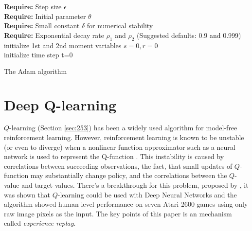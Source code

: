             \begin{algorithm}[H]\label{alg:5}
            \textbf{Require:} Step size $\epsilon$ \\
            \textbf{Require:} Initial parameter $\theta$ \\
            \textbf{Require:} Small constant $\delta $ for numerical stability \\
            \textbf{Require:} Exponential decay rate $\rho_1$ and $\rho_2$ (Suggested defaults: 0.9 and 0.999)
                initialize 1st and 2nd moment variables $s=0, r=0$ \\
                initialize time step t=0\\
            
            \caption{The Adam algorithm}
            \end{algorithm}

\section{Deep Q-learning}
    \label{sec:dql}
    $Q$-learning (Section \ref{sec:253}) has been a widely used algorithm for model-free reinforcement learning. However, reinforcement learning is known to be unstable (or even to diverge) when a nonlinear function approximator such as a neural network is used to represent the Q-function \cite{Tsitsiklis97ananalysis}. This instability is caused by correlations between succeeding observations, the fact, that small updates of $Q$-function
    may substantially change policy, and the correlations between the $Q$-value and target values. There's a breakthrough for this problem, proposed by \cite{mnih2015humanlevel}, it was shown that $Q$-learning could be used with Deep Neural Networks and the algorithm showed human level performance on seven Atari 2600 games using only raw image pixels as the input. The key points of this paper is an mechanism called \textit{experience replay}.
    \par
